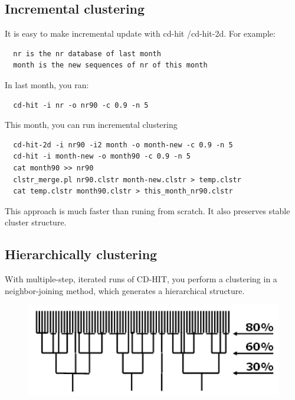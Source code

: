 \documentclass[12pt,a4paper]{article}
\begin{document}
\subsection{Incremental clustering }

It is easy to make incremental update with cd-hit /cd-hit-2d. For example:

\begin{lstlisting}
  nr is the nr database of last month
  month is the new sequences of nr of this month
\end{lstlisting}

In last month, you ran:

\begin{lstlisting}
  cd-hit -i nr -o nr90 -c 0.9 -n 5
\end{lstlisting}

This month, you can run incremental clustering

\begin{lstlisting}
  cd-hit-2d -i nr90 -i2 month -o month-new -c 0.9 -n 5
  cd-hit -i month-new -o month90 -c 0.9 -n 5
  cat month90 >> nr90
  clstr_merge.pl nr90.clstr month-new.clstr > temp.clstr
  cat temp.clstr month90.clstr > this_month_nr90.clstr 
\end{lstlisting}

This approach is much faster than runing from scratch. It also preserves
stable cluster structure. 

\subsection{Hierarchically clustering }

With multiple-step, iterated runs of CD-HIT, you perform a clustering in a
neighbor-joining method, which generates a hierarchical structure.  

    

\begin{figure}[!h]
\includegraphics[width=\textwidth]{Figure4.png}

\end{figure}
\end{document}
